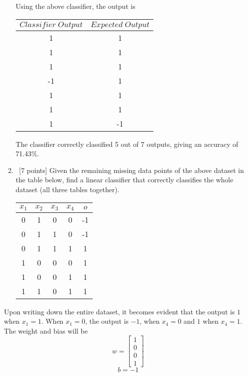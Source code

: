 \begin{enumerate}
Using the above classifier, the output is 
  \begin{center}
    \begin{tabular}{c|c}
      $Classifier \; Output$ & $Expected \; Output$ \\ \hline
      1 & 1 \\
      1 &  1 \\
       1 & 1 \\
       -1 & 1 \\
       1 & 1 \\
       1 &1 \\
      1 &-1 \\
    \end{tabular}
  \end{center}
  
  The classifier correctly classified 5 out of 7 outputs, giving an accuracy of 71.43\%.

\item ~[7 points] Given the remaining missing data points of the above dataset in the table below, find a linear classifier that correctly classifies the whole dataset (all three tables together). 
  \begin{center}
    \begin{tabular}{cccc|c}
      $x_1$ & $x_2$ & $x_3$ & $x_4$ & $o$ \\ \hline
      0 & 1 & 0 & 0 & -1\\
      0 & 1 & 1 & 0 & -1 \\
      0 & 1 & 1 & 1 & 1 \\
      1 & 0 & 0 & 0 & 1 \\
      1 & 0 & 0 & 1 & 1 \\
      1 & 1 & 0 & 1 & 1 \\
    \end{tabular}
  \end{center}
\end{enumerate}

Upon writing down the entire dataset, it becomes evident that the output is $1$ when $x_1 = 1$. When $x_1 = 0$, the output is $-1$, when $x_4=0$ and $1$ when $x_4=1$. The weight and bias will be
  \begin{equation*}
     w=\begin{bmatrix}
         1\\
         0 \\
         0\\
         1
        \end{bmatrix}
  \end{equation*}
  $$
  b=-1
  $$



